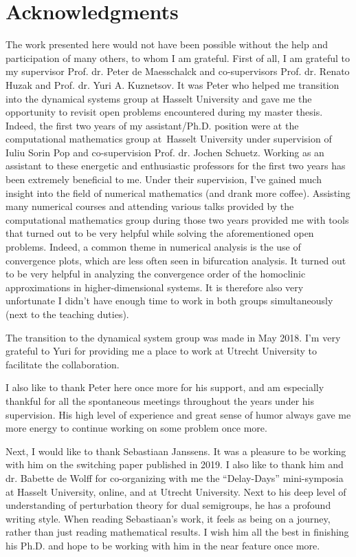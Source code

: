 \section{Acknowledgments}
The work presented here would not have been possible without the help and
participation of many others, to whom I am grateful. First of all, I am grateful
to my supervisor Prof. dr. Peter de Maesschalck and co-supervisors Prof. dr.
Renato Huzak and Prof. dr. Yuri A. Kuznetsov. It was Peter who helped me
transition into the dynamical systems group at Hasselt University and gave me the
opportunity to revisit open problems encountered during my master thesis. Indeed,
the first two years of my assistant/Ph.D. position were at the computational
mathematics group at Hasselt University under supervision of Iuliu Sorin Pop and
co-supervision Prof. dr. Jochen Schuetz. Working as an assistant to these
energetic and enthusiastic professors for the first two years has been extremely
beneficial to me. Under their supervision, I've gained much insight into the field
of numerical mathematics (and drank more coffee). Assisting many numerical
courses and attending various talks provided by the computational mathematics
group during those two years provided me with tools that turned out to be very
helpful while solving the aforementioned open problems. Indeed, a common theme in
numerical analysis is the use of convergence plots, which are less often seen in
bifurcation analysis. It turned out to be very helpful in analyzing the
convergence order of the homoclinic approximations in higher-dimensional systems.
It is therefore also very unfortunate I didn't have enough time to work in both
groups simultaneously (next to the teaching duties).

The transition to the dynamical system group was made in May 2018. I'm very
grateful to Yuri for providing me a place to work at Utrecht University to
facilitate the collaboration.

I also like to thank Peter here once more for his support, and am especially
thankful for all the spontaneous meetings throughout the years under his
supervision. His high level of experience and great sense of humor always gave me
more energy to continue working on some problem once more.

Next, I would like to thank Sebastiaan Janssens. It was a pleasure to be working
with him on the switching paper published in 2019. I also like to thank him and
dr. Babette de Wolff for co-organizing with me the ``Delay-Days'' mini-symposia
at Hasselt University, online, and at Utrecht University. Next to his deep level
of understanding of perturbation theory for dual semigroups, he has a profound
writing style. When reading Sebastiaan's work, it feels as being on a journey,
rather than just reading mathematical results. I wish him all the best in
finishing his Ph.D. and hope to be working with him in the near feature once
more.

